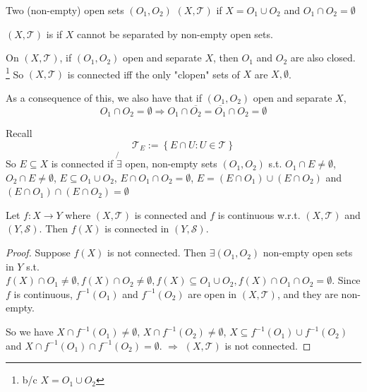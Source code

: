 \begin{defn}
    Two (non-empty) open sets $(O_1, O_2)$  $(X, \mathcal{T})$ if 
    $X = O_1 \cup O_2$ and $O_1 \cap O_2 = \emptyset$    
\end{defn}

\begin{defn}[connected]
    $(X, \mathcal{T})$ is  if $X$ cannot be separated by non-empty open sets.
\end{defn}

\begin{rem}
    On $(X, \mathcal{T})$, if $(O_1, O_2)$ open and separate $X$, then $O_1$ and $O_2$ are also closed.
    \footnote{b/c $X = O_1 \cup O_2$} So $(X, \mathcal{T})$ is connected iff the only "clopen" sets of
    $X$ are $X, \emptyset$.  
    
    As a consequence of this, we also have that if $(O_1, O_2)$ open and separate $X$, 
    \[
        O_1 \cap O_2 = \emptyset \Rightarrow O_1 \cap \overline{O_2} = \overline{O_1} \cap O_2 = \emptyset
    \]   
\end{rem}

\begin{rem}
    Recall
    \[
        \mathcal{T}_E := \left\{ E \cap U : U \in \mathcal{T} \right\} 
    \] 
    So $E \subseteq X$ is connected if $\not{\exists}$ open, non-empty sets $(O_1, O_2)$ s.t. 
    $O_1 \cap E \neq \emptyset$, $O_2 \cap E \neq \emptyset$, $E \subseteq O_1 \cup O_2$, 
    $E \cap O_1 \cap O_2 = \emptyset$, $E = (E \cap O_1) \cup (E \cap O_2)$ and 
    $(E \cap O_1) \cap (E \cap O_2) = \emptyset$         
\end{rem}
\begin{prop}
    Let $f : X \to Y$ where $(X, \mathcal{T})$ is connected and $f$ is continuous w.r.t. $(X, \mathcal{T})$
    and $(Y, \mathcal{S})$. Then $f(X)$ is connected in $(Y, \mathcal{S})$.       
\end{prop}
\begin{proof}
    Suppose $f(X)$ is not connected. Then $\exists (O_1, O_2)$ non-empty open sets in $Y$ s.t.
    $f(X) \cap O_1 \neq \emptyset, f(X) \cap O_2 \neq \emptyset, f(X) \subseteq O_1 \cup O_2, f(X) \cap
    O_1 \cap O_2 = \emptyset$.
    Since $f$ is continuous, $f^{-1}(O_1)$ and $f^{-1}(O_2)$ are open in $(X, \mathcal{T})$, and they are
    non-empty. 

    So we have $X \cap f^{-1}(O_1) \neq \emptyset$, $X \cap f^{-1}(O_2) \neq \emptyset$, $
    X \subseteq f^{-1}(O_1) \cup f^{-1}(O_2)$ and $X \cap f^{-1}(O_1) \cap f^{-1}(O_2) = \emptyset$.
    $\Rightarrow$ $(X, \mathcal{T})$ is not connected. \qedhere    
\end{proof}

